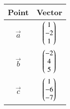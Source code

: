 \begin{tabular}{|c|c|}
\hline
Point & Vector \\
\hline
$\vec{a}$ & $\begin{pmatrix}1 \\ -2 \\ 1\end{pmatrix}$ \\
\hline
$\vec{b}$ & $\begin{pmatrix}-2 \\ 4 \\ 5\end{pmatrix}$ \\
\hline
$\vec{c}$ & $\begin{pmatrix}1 \\ -6 \\ -7\end{pmatrix}$ \\
\hline
\end{tabular}

